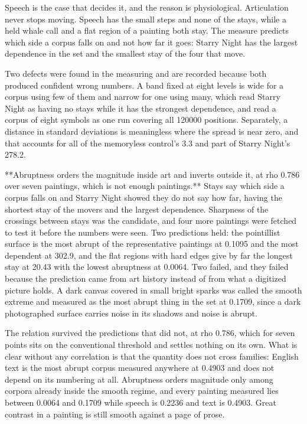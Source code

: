Speech is the case that decides it, and the reason is physiological. Articulation never stops moving. Speech has the small steps and none of the stays, while a held whale call and a flat region of a painting both stay. The measure predicts which side a corpus falls on and not how far it goes: Starry Night has the largest dependence in the set and the smallest stay of the four that move.

Two defects were found in the measuring and are recorded because both produced confident wrong numbers. A band fixed at eight levels is wide for a corpus using few of them and narrow for one using many, which read Starry Night as having no stays while it has the strongest dependence, and read a corpus of eight symbols as one run covering all 120000 positions. Separately, a distance in standard deviations is meaningless where the spread is near zero, and that accounts for all of the memoryless control's 3.3 and part of Starry Night's 278.2.

**Abruptness orders the magnitude inside art and inverts outside it, at rho 0.786 over seven paintings, which is not enough paintings.** Stays say which side a corpus falls on and Starry Night showed they do not say how far, having the shortest stay of the movers and the largest dependence. Sharpness of the crossings between stays was the candidate, and four more paintings were fetched to test it before the numbers were seen. Two predictions held: the pointillist surface is the most abrupt of the representative paintings at 0.1095 and the most dependent at 302.9, and the flat regions with hard edges give by far the longest stay at 20.43 with the lowest abruptness at 0.0064. Two failed, and they failed because the prediction came from art history instead of from what a digitized picture holds. A dark canvas covered in small bright sparks was called the smooth extreme and measured as the most abrupt thing in the set at 0.1709, since a dark photographed surface carries noise in its shadows and noise is abrupt.

The relation survived the predictions that did not, at rho 0.786, which for seven points sits on the conventional threshold and settles nothing on its own. What is clear without any correlation is that the quantity does not cross families: English text is the most abrupt corpus measured anywhere at 0.4903 and does not depend on its numbering at all. Abruptness orders magnitude only among corpora already inside the smooth regime, and every painting measured lies between 0.0064 and 0.1709 while speech is 0.2236 and text is 0.4903. Great contrast in a painting is still smooth against a page of prose.

